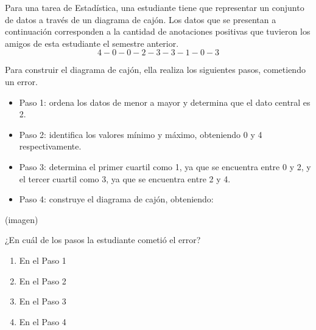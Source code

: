 \begin{problem}
    Para una tarea de Estadística, una estudiante tiene que representar un conjunto de datos a través de un diagrama de cajón. Los datos que se presentan a continuación corresponden a la cantidad de anotaciones positivas que tuvieron los amigos de esta estudiante el semestre anterior.
    \[
    4 - 0 - 0 - 2 - 3 - 3 - 1 - 0 - 3
    \]

    Para construir el diagrama de cajón, ella realiza los siguientes pasos, cometiendo un error.

    \begin{itemize}
        \item Paso 1: ordena los datos de menor a mayor y determina que el dato central es 2.
        \item Paso 2: identifica los valores mínimo y máximo, obteniendo 0 y 4 respectivamente.
        \item Paso 3: determina el primer cuartil como 1, ya que se encuentra entre 0 y 2, y el tercer cuartil como 3, ya que se encuentra entre 2 y 4.
        \item Paso 4: construye el diagrama de cajón, obteniendo:
    \end{itemize}

    \begin{center}
    (imagen)
    \end{center}

    ¿En cuál de los pasos la estudiante cometió el error?

    \begin{enumerate}[label=\Alph*.]
        \item En el Paso 1
        \item En el Paso 2
        \item En el Paso 3
        \item En el Paso 4
    \end{enumerate}
\end{problem}
